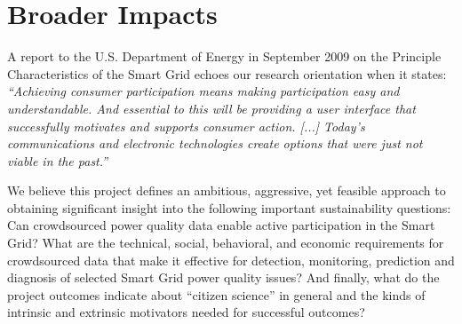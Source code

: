 
\section{Broader Impacts}
\label{sec:merit}



A report to the U.S. Department of Energy in September 2009 on the
Principle Characteristics of the Smart Grid echoes our research orientation
when it states: {\em ``Achieving consumer participation means
  making participation easy and understandable.  And essential to this will
  be providing a user interface that successfully motivates and supports
  consumer action. [...] Today's communications and electronic technologies
  create options that were just not viable in the past.''}
\cite{NETL:EnablesActiveParticipation}

We believe this project defines an ambitious, aggressive, yet feasible approach to obtaining significant insight into the following important sustainability questions: Can crowdsourced power quality data enable active participation in the Smart Grid?  What are the technical, social, behavioral, and economic requirements for crowdsourced data that make it effective for detection, monitoring, prediction and diagnosis of selected Smart Grid power quality issues? And finally, what do the project outcomes indicate about ``citizen science'' in general and the kinds of intrinsic and extrinsic motivators needed for successful outcomes?

